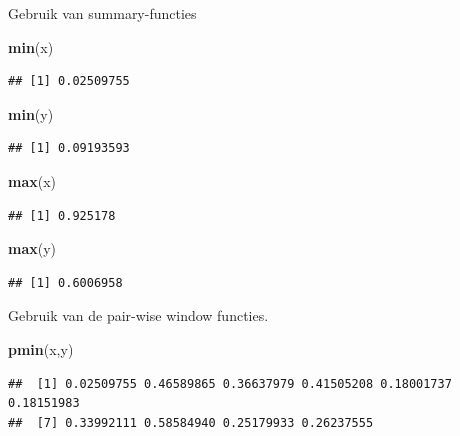 \documentclass[]{tufte-book}
\newenvironment{Shaded}{}{}
\newcommand{\KeywordTok}[1]{\textcolor[rgb]{0.00,0.44,0.13}{\textbf{#1}}}
\newcommand{\NormalTok}[1]{#1}
\begin{document}
Gebruik van summary-functies

\begin{Shaded}
\begin{Highlighting}[]
\KeywordTok{min}\NormalTok{(x)}
\end{Highlighting}
\end{Shaded}

\begin{verbatim}
## [1] 0.02509755
\end{verbatim}

\begin{Shaded}
\begin{Highlighting}[]
\KeywordTok{min}\NormalTok{(y)}
\end{Highlighting}
\end{Shaded}

\begin{verbatim}
## [1] 0.09193593
\end{verbatim}

\begin{Shaded}
\begin{Highlighting}[]
\KeywordTok{max}\NormalTok{(x)}
\end{Highlighting}
\end{Shaded}

\begin{verbatim}
## [1] 0.925178
\end{verbatim}

\begin{Shaded}
\begin{Highlighting}[]
\KeywordTok{max}\NormalTok{(y)}
\end{Highlighting}
\end{Shaded}

\begin{verbatim}
## [1] 0.6006958
\end{verbatim}

Gebruik van de pair-wise window functies.

\begin{Shaded}
\begin{Highlighting}[]
\KeywordTok{pmin}\NormalTok{(x,y)}
\end{Highlighting}
\end{Shaded}

\begin{verbatim}
##  [1] 0.02509755 0.46589865 0.36637979 0.41505208 0.18001737 0.18151983
##  [7] 0.33992111 0.58584940 0.25179933 0.26237555
\end{verbatim}
\end{document}
